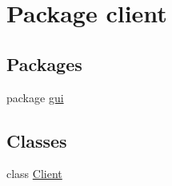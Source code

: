 \hypertarget{namespaceclient}{}\section{Package client}
\label{namespaceclient}
\subsection*{Packages}
\begin{DoxyCompactItemize}
\item 
package \hyperlink{namespaceclient_1_1gui}{gui}
\end{DoxyCompactItemize}
\subsection*{Classes}
\begin{DoxyCompactItemize}
\item 
class \hyperlink{classclient_1_1_client}{Client}
\end{DoxyCompactItemize}
